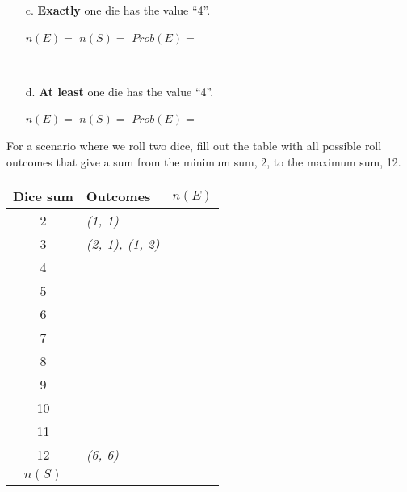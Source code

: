 {\begin{questionNOGRADE}{\thequestion}
\begin{enumerate}
            ~\\
            \item[c.]   \textbf{Exactly} one die has the value ``4''.

                \vspace{1cm}
                
                $n(E) = $ {\fitb}
                \tab
                $n(S) = $ {\fitb}
                \tab
                $Prob(E) = $ {\fitb}

            ~\\
            \item[d.]   \textbf{At least} one die has the value ``4''.

                \vspace{1cm}
                
                $n(E) = $ {\fitb}
                \tab
                $n(S) = $ {\fitb}
                \tab
                $Prob(E) = $ {\fitb}
        \end{enumerate}
    \end{questionNOGRADE}

    \newpage

    \begin{questionNOGRADE}{\thequestion}
        For a scenario where we roll two dice, fill out the table with
        all possible roll outcomes that give a sum from the minimum sum, 2,
        to the maximum sum, 12.
    \end{questionNOGRADE}

    \Large
    \begin{center}
        \begin{tabular}{c | p{8cm} | l }
            \textbf{Dice sum} & \textbf{Outcomes} & \textbf{$n(E)$} \\ \hline
            2 & \textit{(1, 1)}
            \\ \hline
            3 & \textit{(2, 1), (1, 2)}
            \\ \hline
            4 &
            \\ \hline
            5 &
            \\ \hline
            6 &
            \\ \hline
            7 &
            \\ \hline
            8 &
            \\ \hline
            9 &
            \\ \hline
            10 &
            \\ \hline
            11 &
            \\ \hline
            12 & \textit{(6, 6)}
            \\ \hline
            $n(S)$ &
            \\ \hline
        \end{tabular}
    \end{center}
    \normalsize

}
